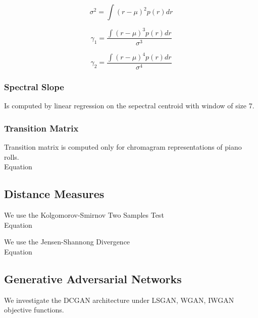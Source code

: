 \begin{equation}
    \sigma^2 = \int (r - \mu)^2 p(r) dr
\end{equation}

\begin{equation}
    \gamma_1 = \frac{\int (r - \mu)^3 p(r) dr}{\sigma^3}
\end{equation}

\begin{equation}
    \gamma_2 = \frac{\int (r - \mu)^4 p(r) dr}{\sigma^4}
\end{equation}
\subsubsection{Spectral Slope}
Is computed by linear regression on the sepectral centroid with window of size
7.

\subsubsection{Transition Matrix}
Transition matrix is computed only for chromagram representations of piano
rolls. \\
Equation

\subsection{Distance Measures}
We use the Kolgomorov-Smirnov Two Samples Test\\
Equation

We use the Jensen-Shannong Divergence\\
Equation

\subsection{Generative Adversarial Networks}
We investigate the DCGAN architecture under LSGAN, WGAN, IWGAN objective
functions.
